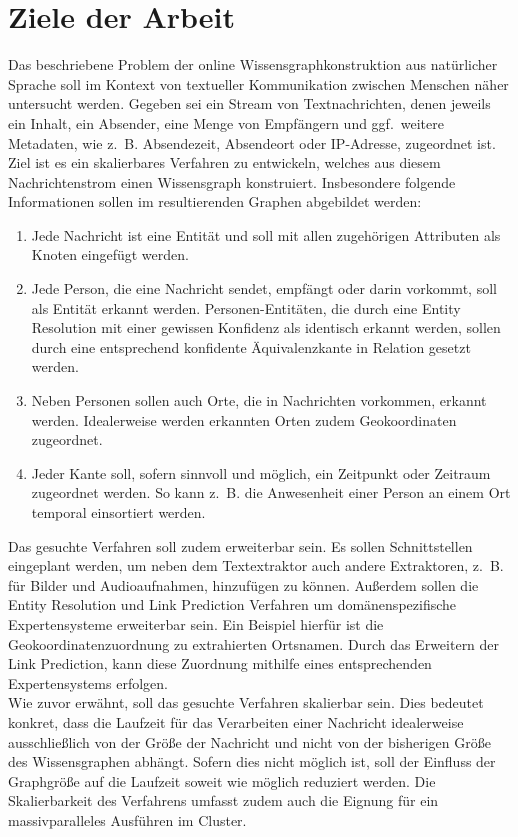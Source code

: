 \documentclass[11pt, a4paper]{scrreprt}
\begin{document}
\section{Ziele der Arbeit}

Das beschriebene Problem der online Wissensgraphkonstruktion aus natürlicher Sprache soll im Kontext von textueller Kommunikation zwischen Menschen näher untersucht werden.
Gegeben sei ein Stream von Textnachrichten, denen jeweils ein Inhalt, ein Absender, eine Menge von Empfängern und ggf.\ weitere Metadaten, wie z.~B. Absendezeit, Absendeort oder IP-Adresse, zugeordnet ist.
Ziel ist es ein skalierbares Verfahren zu entwickeln, welches aus diesem Nachrichtenstrom einen Wissensgraph konstruiert.
Insbesondere folgende Informationen sollen im resultierenden Graphen abgebildet werden:
\begin{enumerate}
	\item Jede Nachricht ist eine Entität und soll mit allen zugehörigen Attributen als Knoten eingefügt werden.
	\item Jede Person, die eine Nachricht sendet, empfängt oder darin vorkommt, soll als Entität erkannt werden.
		Personen-Entitäten, die durch eine Entity Resolution mit einer gewissen Konfidenz als identisch erkannt werden, sollen durch eine entsprechend konfidente Äquivalenzkante in Relation gesetzt werden.
	\item Neben Personen sollen auch Orte, die in Nachrichten vorkommen, erkannt werden.
		Idealerweise werden erkannten Orten zudem Geokoordinaten zugeordnet.
	\item Jeder Kante soll, sofern sinnvoll und möglich, ein Zeitpunkt oder Zeitraum zugeordnet werden.
		So kann z.~B. die Anwesenheit einer Person an einem Ort temporal einsortiert werden.
\end{enumerate}

Das gesuchte Verfahren soll zudem erweiterbar sein.
Es sollen Schnittstellen eingeplant werden, um neben dem Textextraktor auch andere Extraktoren, z.~B. für Bilder und Audioaufnahmen, hinzufügen zu können.
Außerdem sollen die Entity Resolution und Link Prediction Verfahren um domänenspezifische Expertensysteme erweiterbar sein.
Ein Beispiel hierfür ist die Geokoordinatenzuordnung zu extrahierten Ortsnamen.
Durch das Erweitern der Link Prediction, kann diese Zuordnung mithilfe eines entsprechenden Expertensystems erfolgen.\\

Wie zuvor erwähnt, soll das gesuchte Verfahren skalierbar sein.
Dies bedeutet konkret, dass die Laufzeit für das Verarbeiten einer Nachricht idealerweise ausschließlich von der Größe der Nachricht und nicht von der bisherigen Größe des Wissensgraphen abhängt.
Sofern dies nicht möglich ist, soll der Einfluss der Graphgröße auf die Laufzeit soweit wie möglich reduziert werden.
Die Skalierbarkeit des Verfahrens umfasst zudem auch die Eignung für ein massivparalleles Ausführen im Cluster.\\
\end{document}
